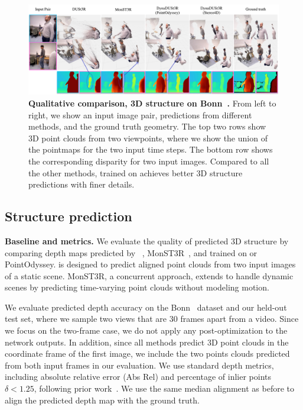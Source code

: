 \begin{figure}[ht]
    \centering
    \includegraphics[width=\linewidth]{fig/depth_comparison.pdf}
    \caption{\textbf{Qualitative comparison, 3D structure on Bonn~\cite{palazzolo2019iros}.}  From left to right, we show an input image pair, predictions from different methods, and the ground truth geometry. 
    The top two rows show 3D point clouds from two viewpoints, where we show the union of the pointmaps for the two input time steps. The bottom row shows the corresponding disparity for two input images. 
    Compared to all the other methods, \method trained on \dataset achieves better 3D structure predictions with finer details.}
    \label{fig:compare-bonn}
\end{figure}

\subsection{Structure prediction} \label{sec:structure_eval}
\noindent \textbf{Baseline and metrics.}
We evaluate the quality of predicted 3D structure by comparing depth maps predicted by \duster~\cite{wang2024dust3r}, MonST3R~\cite{zhang2024monst3r}, and \method trained on \dataset or PointOdyssey. 
\duster is designed to predict aligned point clouds from two input images of a static scene.
MonST3R, a concurrent approach, extends \duster to handle dynamic scenes by predicting time-varying point clouds without modeling motion.

We evaluate predicted depth accuracy on the Bonn~\cite{palazzolo2019iros} dataset and our held-out test set, where we sample two views that are 30 frames apart from a video. 
Since we focus on the two-frame case, we do not apply any post-optimization to the network outputs.
In addition, since all methods predict 3D point clouds in the coordinate frame of the first image, we include the two points clouds predicted from both input frames in our evaluation. We use standard depth metrics, including absolute relative error (Abs Rel) and percentage of inlier points $\delta<1.25$, following prior work~\cite{NVDS, zhang2024monst3r}.  We use the same median alignment as before to align the predicted depth map with the ground truth.

